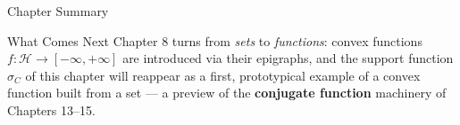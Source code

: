 \documentclass[aspectratio=169,10pt]{beamer}
\newcommand{\Hil}{\mathcal{H}}
\begin{document}
\begin{frame}[allowframebreaks]{Chapter Summary}
  \begin{alertblock}{What Comes Next}
    Chapter 8 turns from \emph{sets} to \emph{functions}: convex functions
    $f : \Hil \to [-\infty,+\infty]$ are introduced via their epigraphs, and
    the support function $\sigma_C$ of this chapter will reappear as a
    first, prototypical example of a convex function built from a set ---
    a preview of the \textbf{conjugate function} machinery of Chapters
    13--15.
  \end{alertblock}

\end{frame}
\end{document}
